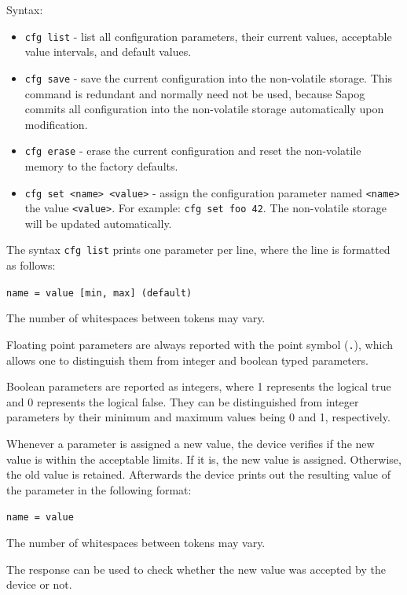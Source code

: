 \documentclass{zubaxdoc}
\begin{document}
Syntax:
\begin{itemize}
    \item \verb|cfg list| - list all configuration parameters, their current values,
          acceptable value intervals, and default values.
    
    \item \verb|cfg save| - save the current configuration into the non-volatile storage.
          This command is redundant and normally need not be used, because Sapog commits all configuration
          into the non-volatile storage automatically upon modification.
    
    \item \verb|cfg erase| - erase the current configuration and reset the non-volatile memory to
          the factory defaults.
    
    \item \verb|cfg set <name> <value>| - assign the configuration parameter named \verb|<name>| the value
          \verb|<value>|. For example: \verb|cfg set foo 42|.
          The non-volatile storage will be updated automatically.
\end{itemize}

The syntax \verb|cfg list| prints one parameter per line, where the line is formatted as follows:

\verb|name = value [min, max] (default)|

The number of whitespaces between tokens may vary.

Floating point parameters are always reported with the point symbol (\verb|.|),
which allows one to distinguish them from integer and boolean typed parameters.

Boolean parameters are reported as integers, where 1 represents the logical true and
0 represents the logical false.
They can be distinguished from integer parameters by their minimum and maximum values being 0 and 1,
respectively.

Whenever a parameter is assigned a new value, the device verifies if the new value is within the
acceptable limits.
If it is, the new value is assigned. Otherwise, the old value is retained.
Afterwards the device prints out the resulting value of the parameter in the following format:

\verb|name = value|

The number of whitespaces between tokens may vary.

The response can be used to check whether the new value was accepted by the device or not.
\end{document}
